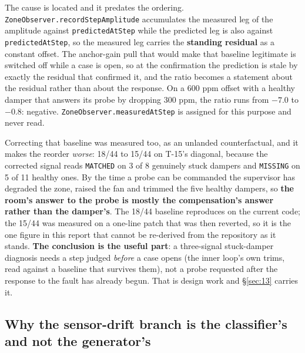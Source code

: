 \begin{itemize}
The cause is located and it predates the ordering. \texttt{ZoneObserver.recordStepAmplitude}
accumulates the measured leg of the amplitude against \texttt{predictedAtStep} while the predicted
leg is also against \texttt{predictedAtStep}, so the measured leg carries the \textbf{standing
residual} as a constant offset. The anchor-gain pull that would make that baseline legitimate is
switched off while a case is open, so at the confirmation the prediction is stale by exactly the
residual that confirmed it, and the ratio becomes a statement about the residual rather than about
the response. On a 600 ppm offset with a healthy damper that answers its probe by dropping 300 ppm,
the ratio runs from $-7.0$ to $-0.8$: negative. \texttt{ZoneObserver.measuredAtStep} is assigned for
this purpose and never read.

Correcting that baseline was measured too, as an unlanded counterfactual, and it makes the reorder
\emph{worse}: 18/44 to 15/44 on T-15's diagonal, because the corrected signal reads \texttt{MATCHED}
on 3 of 8 genuinely stuck dampers and \texttt{MISSING} on 5 of 11 healthy ones. By the time a probe
can be commanded the supervisor has degraded the zone, raised the fan and trimmed the five healthy
dampers, so \textbf{the room's answer to the probe is mostly the compensation's answer rather than
the damper's}. The 18/44 baseline reproduces on the current code; the 15/44 was measured on a one-line patch that was then reverted, so it is the one figure in this report that cannot be re-derived from the repository as it stands. \textbf{The conclusion is the useful part}: a three-signal stuck-damper diagnosis
needs a step judged \emph{before} a case opens (the inner loop's own trims, read against a
baseline that survives them), not a probe requested after the response to the fault has already
begun. That is design work and §\ref{sec:13} carries it.
\end{itemize}

\subsection{Why the sensor-drift branch is the classifier's and not the generator's}\label{sec:D.3}

